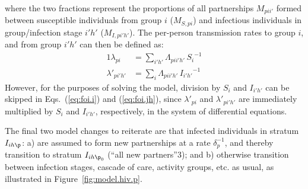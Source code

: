 where the two fractions represent the proportions of all partnerships $M_{pii'}$
formed between susceptible individuals from group $i$ ($M_{S,pi}$)
and infectious individuals in group/infection stage $i'h'$ ($M_{I,pi'h'}$).
The per-person transmission rates to group $i$, and from group $i'h'$ can then be defined as:
\begin{alignat}{1}
  \lambda_{pi} &= \sum_{i'h'} \Lambda_{pii'h'}\,{S_{i}}^{-1} \label{eq:foi.i} \\
  \lambda'_{pi'h'} &= \sum_{i} \Lambda_{pii'h'}\,{I_{i'h'}}^{-1} \label{eq:foi.jh}
\end{alignat}
However, for the purposes of solving the model,
division by $S_{i}$ and $I_{i'h'}$ can be skipped in Eqs.~(\ref{eq:foi.i}) and (\ref{eq:foi.jh}),
since $\lambda'_{pi}$ and $\lambda'_{pi'h'}$ are immediately multiplied by $S_{i}$ and $I_{i'h'}$,
respectively, in the system of differential equations.
\par
The final two model changes to reiterate are that infected individuals in stratum $I_{ih\p}$:
a) are assumed to form new partnerships at a rate $\delta_p^{-1}$,
and thereby transition to stratum $I_{ih\p_0}$ (``all new partners''3); and
b) otherwise transition between infection stages, cascade of care, activity groups, etc. as usual,
as illustrated in Figure~\ref{fig:model.hiv.p}.
